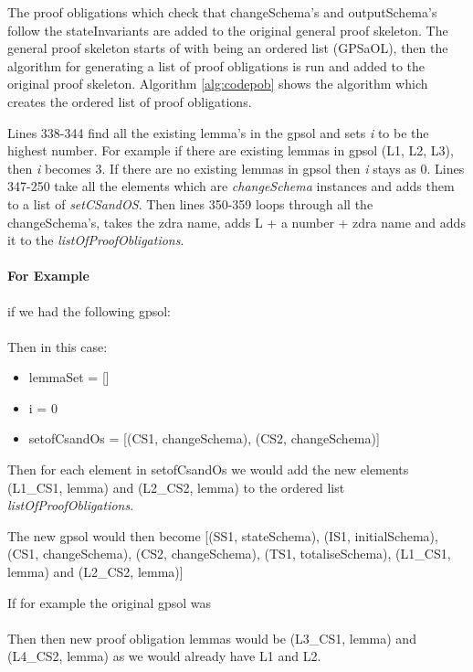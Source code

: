 The proof obligations which check that changeSchema's and outputSchema's follow
the stateInvariants are added to the original general proof skeleton. The
general proof skeleton starts of with being an ordered list (GPSaOL), then the
algorithm for generating a list of proof obligations is run and added to the
original proof skeleton. Algorithm \ref{alg:codepob} shows the algorithm which
creates the ordered list of proof obligations.

Lines 338-344 find all the existing lemma's in the \gls{gpsol} and sets \emph{i}
to be the highest number. For example if there are existing lemmas in
\gls{gpsol} (L1, L2, L3), then \emph{i} becomes 3. If there are no existing
lemmas in \gls{gpsol} then \emph{i} stays as 0. Lines 347-250 take all the
elements which are \emph{changeSchema} instances and adds them to a list of
\emph{setCSandOS}. Then lines 350-359 loops through all the changeSchema's,
takes the \gls{zdra} name, adds L + a number + \gls{zdra} name and adds it to
the \emph{listOfProofObligations}.

\paragraph{For Example}

if we had the following \gls{gpsol}: \\
 \\
Then in this case:
\begin{itemize}
\item lemmaSet = []
\item i = 0
\item setofCsandOs = [(CS1, changeSchema), (CS2, changeSchema)]
\end{itemize}

Then for each element in setofCsandOs we would add the new elements (L1\_CS1,
lemma) and (L2\_CS2, lemma) to the ordered list \emph{listOfProofObligations}.

The new \gls{gpsol} would then become [(SS1, stateSchema), (IS1, initialSchema),
(CS1, changeSchema), (CS2, changeSchema), (TS1, totaliseSchema), (L1\_CS1,
lemma) and (L2\_CS2, lemma)]

If for example the original \gls{gpsol} was \\
\\
Then then new proof obligation lemmas would be (L3\_CS1, lemma) and (L4\_CS2,
lemma) as we would already have L1 and L2.

